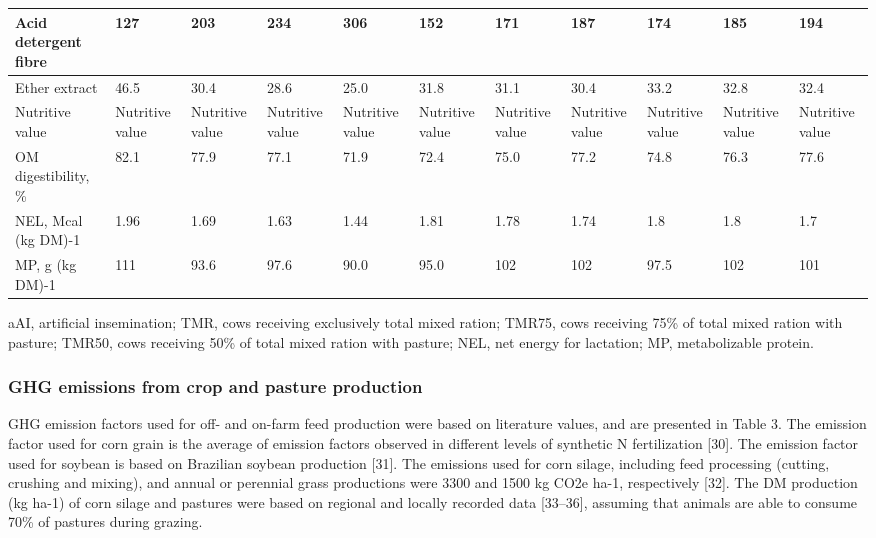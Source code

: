 \documentclass[11pt,a4paper]{article}
\begin{document}
\begin{table}[h]
\begin{tabular}{|l|l|l|l|l|l|l|l|l|l|l|}
Acid detergent fibre & 127 & 203 & 234 & 306 & 152 & 171 & 187 & 174 & 185 & 194 \\ \hline
Ether extract & 46.5 & 30.4 & 28.6 & 25.0 & 31.8 & 31.1 & 30.4 & 33.2 & 32.8 & 32.4 \\ \hline
Nutritive value & Nutritive value & Nutritive value & Nutritive value & Nutritive value & Nutritive value & Nutritive value & Nutritive value & Nutritive value & Nutritive value & Nutritive value \\ \hline
OM digestibility, \% & 82.1 & 77.9 & 77.1 & 71.9 & 72.4 & 75.0 & 77.2 & 74.8 & 76.3 & 77.6 \\ \hline
NEL, Mcal (kg DM)-1 & 1.96 & 1.69 & 1.63 & 1.44 & 1.81 & 1.78 & 1.74 & 1.8 & 1.8 & 1.7 \\ \hline
MP, g (kg DM)-1 & 111 & 93.6 & 97.6 & 90.0 & 95.0 & 102 & 102 & 97.5 & 102 & 101 \\ \hline
\end{tabular}
\end{table}

aAI, artificial insemination; TMR, cows receiving exclusively total mixed ration; TMR75, cows receiving 75\% of total mixed ration with pasture; TMR50, cows receiving 50\% of total mixed ration with pasture; NEL, net energy for lactation; MP, metabolizable protein.

\subsubsection{GHG emissions from crop and pasture production}

GHG emission factors used for off- and on-farm feed production were based on literature values, and are presented in Table 3. The emission factor used for corn grain is the average of emission factors observed in different levels of synthetic N fertilization [30]. The emission factor used for soybean is based on Brazilian soybean production [31]. The emissions used for corn silage, including feed processing (cutting, crushing and mixing), and annual or perennial grass productions were 3300 and 1500 kg CO2e ha-1, respectively [32]. The DM production (kg ha-1) of corn silage and pastures were based on regional and locally recorded data [33–36], assuming that animals are able to consume 70\% of pastures during grazing.
\end{document}

